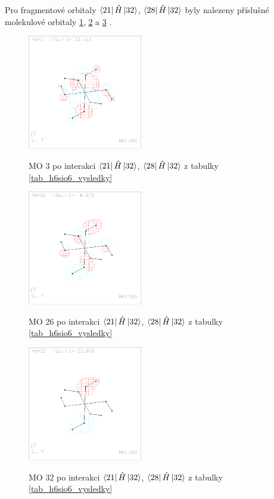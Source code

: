 \documentclass[
  digital, %
  table,   %
  lof,     %
  lot,     %
]{fithesis3}
\begin{document}
Pro fragmentové orbitaly $\bra{21}{\hat{H}}\ket{32}$, $\bra{28}{\hat{H}}\ket{32}$ byly nalezeny příslušné molekulové orbitaly \ref{obr_h6sio6_MO_s2_3}, \ref{obr_h6sio6_MO_s2_26} a \ref{obr_h6sio6_MO_s2_32} .
  
  \begin{figure}[h]
\caption{MO 3 po interakci $\bra{21}{\hat{H}}\ket{32}$, $\bra{28}{\hat{H}}\ket{32}$  z tabulky \ref{tab_h6sio6_vysledky}}
  \center
  \includegraphics[width=5cm]{h6sio6_obrazky/s2_3.eps}
  \label{obr_h6sio6_MO_s2_3}
  \end{figure}
 
 \begin{figure}[h]
\caption{MO 26 po interakci $\bra{21}{\hat{H}}\ket{32}$, $\bra{28}{\hat{H}}\ket{32}$ z tabulky \ref{tab_h6sio6_vysledky}}
  \center
  \includegraphics[width=5cm]{h6sio6_obrazky/s2_26.eps}
  \label{obr_h6sio6_MO_s2_26}
  \end{figure}

\begin{figure}[h]
\caption{MO 32 po interakci $\bra{21}{\hat{H}}\ket{32}$, $\bra{28}{\hat{H}}\ket{32}$  z tabulky \ref{tab_h6sio6_vysledky}}
  \center
  \includegraphics[width=5cm]{h6sio6_obrazky/s2_32.eps}
  \label{obr_h6sio6_MO_s2_32}
  \end{figure}
\end{document}
